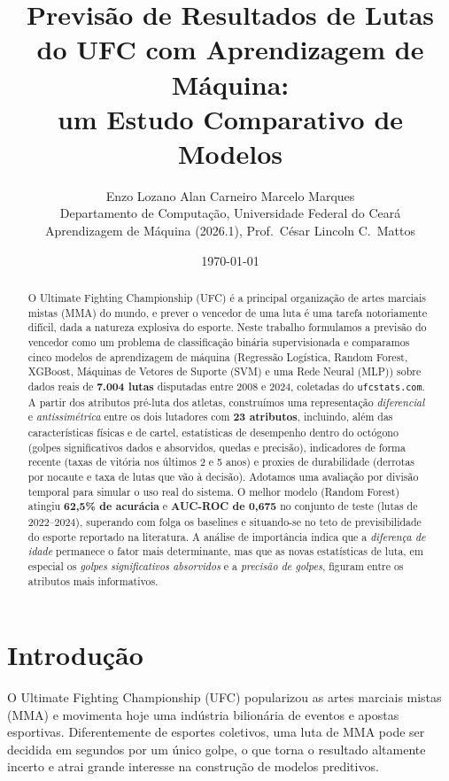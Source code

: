 \documentclass[10pt]{article}
\title{Previsão de Resultados de Lutas do UFC com Aprendizagem de Máquina:\\
um Estudo Comparativo de Modelos}
\author{Enzo Lozano \quad Alan Carneiro \quad Marcelo Marques\\
  Departamento de Computação, Universidade Federal do Ceará\\
  Aprendizagem de Máquina (2026.1), Prof.\ César Lincoln C.\ Mattos}
\date{\today}
\begin{document}
\maketitle

\begin{abstract}
O Ultimate Fighting Championship (UFC) é a principal organização de artes
marciais mistas (MMA) do mundo, e prever o vencedor de uma luta é uma tarefa
notoriamente difícil, dada a natureza explosiva do esporte. Neste trabalho
formulamos a previsão do vencedor como um problema de classificação binária
supervisionada e comparamos cinco modelos de aprendizagem de máquina
(Regressão Logística, Random Forest, XGBoost, Máquinas de Vetores de Suporte
(SVM) e uma Rede Neural (MLP)) sobre dados reais de \textbf{7.004 lutas}
disputadas entre 2008 e 2024, coletadas do \texttt{ufcstats.com}. A partir dos
atributos pré-luta dos atletas, construímos uma representação \emph{diferencial}
e \emph{antissimétrica} entre os dois lutadores com \textbf{23 atributos},
incluindo, além das características físicas e de cartel, estatísticas de
desempenho dentro do octógono (golpes significativos dados e absorvidos,
quedas e precisão), indicadores de forma recente (taxas de vitória nos últimos
2 e 5 anos) e proxies de durabilidade (derrotas por nocaute e taxa de lutas que
vão à decisão). Adotamos uma avaliação por divisão temporal para simular o uso
real do sistema. O melhor modelo (Random Forest) atingiu \textbf{62,5\% de
acurácia} e \textbf{AUC-ROC de 0,675} no conjunto de teste (lutas de
2022--2024), superando com folga os baselines e situando-se no teto de
previsibilidade do esporte reportado na literatura. A análise de importância
indica que a \emph{diferença de idade} permanece o fator mais determinante, mas
que as novas estatísticas de luta, em especial os \emph{golpes
significativos absorvidos} e a \emph{precisão de golpes}, figuram entre os
atributos mais informativos.
\end{abstract}

\section{Introdução}
O Ultimate Fighting Championship (UFC) popularizou as artes marciais mistas
(MMA) e movimenta hoje uma indústria bilionária de eventos e apostas
esportivas. Diferentemente de esportes coletivos, uma luta de MMA pode ser
decidida em segundos por um único golpe, o que torna o resultado altamente
incerto e atrai grande interesse na construção de modelos preditivos.
\end{document}
